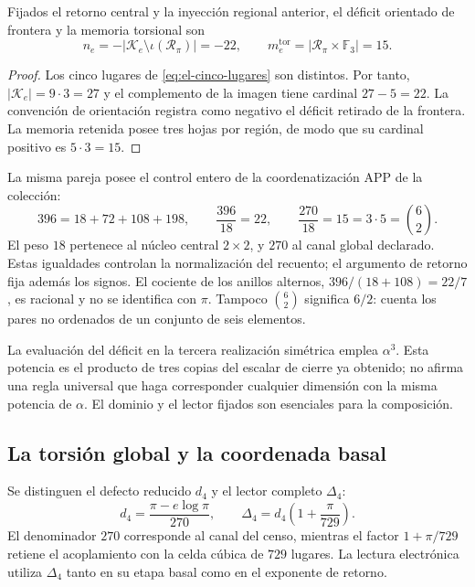 \begin{proposition}
Fijados el retorno central y la inyección regional anterior, el déficit
orientado de frontera y la memoria torsional son
\begin{equation}
 n_e=-|\mathcal K_e\setminus\iota(\mathscr R_\pi)|=-22,
 \qquad
 m_e^{\mathrm{tor}}=|\mathscr R_\pi\times\mathbb F_3|=15.
 \label{eq:el-selector-enteros}
\end{equation}
\end{proposition}
\begin{proof}
Los cinco lugares de \eqref{eq:el-cinco-lugares} son distintos. Por
tanto, \(|\mathcal K_e|=9\cdot3=27\) y el complemento de la imagen
tiene cardinal \(27-5=22\). La convención de orientación registra como
negativo el déficit retirado de la frontera. La memoria retenida posee
tres hojas por región, de modo que su cardinal positivo es
\(5\cdot3=15\).
\end{proof}

La misma pareja posee el control entero de la coordenatización APP de la colección:
\begin{equation}
 396=18+72+108+198,
 \qquad \frac{396}{18}=22,
 \qquad \frac{270}{18}=15=3\cdot5=\binom62.
 \label{eq:el-censo}
\end{equation}
El peso \(18\) pertenece al núcleo central \(2\times2\), y \(270\)
al canal global declarado. Estas igualdades controlan la normalización
del recuento; el argumento de retorno fija además los signos. El
cociente de los anillos alternos,
\(396/(18+108)=22/7\), es racional y no se identifica con \(\pi\).
Tampoco \(\binom62\) significa \(6/2\): cuenta los pares no ordenados
de un conjunto de seis elementos.

La evaluación del déficit en la tercera realización simétrica emplea
\(\alpha^3\). Esta potencia es el producto de tres copias del escalar
de cierre ya obtenido; no afirma una regla universal que haga
corresponder cualquier dimensión con la misma potencia de \(\alpha\).
El dominio y el lector fijados son esenciales para la composición.

\subsection{La torsión global y la coordenada basal}

\begin{definition}
Se distinguen el defecto reducido \(d_4\) y el lector completo
\(\Delta_4\):
\begin{equation}
 d_4=\frac{\pi-e\log\pi}{270},\qquad
 \Delta_4=d_4\left(1+\frac{\pi}{729}\right).
 \label{eq:el-delta}
\end{equation}
El denominador \(270\) corresponde al canal del censo, mientras el
factor \(1+\pi/729\) retiene el acoplamiento con la celda cúbica de
\(729\) lugares. La lectura electrónica utiliza \(\Delta_4\) tanto en
su etapa basal como en el exponente de retorno.
\end{definition}

